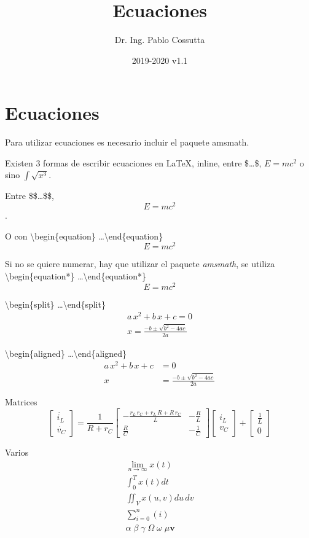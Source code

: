\documentclass[11pt, a4paper]{article}
\title{Ecuaciones}
\author{Dr. Ing. Pablo Cossutta}
\date{2019-2020 v1.1}
\begin{document}
\maketitle
\section{Ecuaciones}
Para utilizar ecuaciones es necesario incluir el paquete amsmath.

Existen 3 formas de escribir ecuaciones en \LaTeX, inline, entre \$\dots \$, $E=mc^2$ o sino $\int \sqrt{x^3}$.

Entre \$\$\dots \$\$, $$E=mc^2$$.

O con \textbackslash begin\{equation\} \dots \textbackslash end\{equation\} 
\begin{equation}
	E=mc^2
\end{equation}

Si no se quiere numerar, hay que utilizar el paquete \textit{amsmath}, se utiliza \textbackslash begin\{equation*\} \dots \textbackslash end\{equation*\} 
\begin{equation*}
	E=mc^2
\end{equation*}

\textbackslash begin\{split\} \dots \textbackslash end\{split\}
\begin{equation}
	\begin{split}
		a\,x^2+b\,x+c = 0\\
		x = \frac{-b \pm \sqrt{b^2-4ac}}{2a}
	\end{split}
\end{equation}

\textbackslash begin\{aligned\} \dots \textbackslash end\{aligned\}
\begin{equation}
\begin{aligned}
	a\,x^2+b\,x+c &= 0\\
	x &= \frac{-b \pm \sqrt{b^2-4ac}}{2a}
\end{aligned}
\end{equation}

Matrices
\begin{equation}
	\begin{bmatrix}
		\dot{i_L} \\
		\dot{v_C}
	\end{bmatrix}
	=
	\frac{1}{R+r_C}
	\begin{bmatrix}
		-\frac{r_L\,r_C+r_L\,R+R\,r_C}{L} & -\frac{R}{L}\\
		\frac{R}{C} & -\frac{1}{C}	
	\end{bmatrix}
	\begin{bmatrix}
		i_L \\
		v_C
	\end{bmatrix}
	+
	\begin{bmatrix}
		\frac{1}{L} \\
		0
	\end{bmatrix}
\end{equation}

Varios
\begin{equation*}
\begin{split}
	\lim_{n \to\infty} x\left(t\right) \\
	\int_0^T x\left(t\right) dt \\
	\iint_V x\left(u,v\right) du\,dv \\
	\sum_{i=0}^n\left(i\right) \\
	\alpha \; \beta \; \gamma \; \Omega \; \omega \; \mu \bm{v}
\end{split}
\end{equation*}
\end{document}
